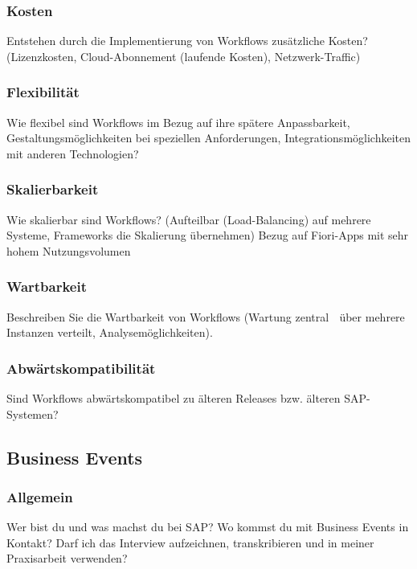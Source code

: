 \subsubsection{Kosten}

Entstehen durch die Implementierung von Workflows zusätzliche Kosten? (Lizenzkosten, Cloud-Abonnement (laufende Kosten), Netzwerk-Traffic)

\subsubsection{Flexibilität}

Wie flexibel sind Workflows im Bezug auf ihre spätere Anpassbarkeit, Gestaltungsmöglichkeiten bei speziellen Anforderungen, Integrationsmöglichkeiten mit anderen Technologien?

\subsubsection{Skalierbarkeit}

Wie skalierbar sind Workflows? (Aufteilbar (Load-Balancing) auf mehrere Systeme, Frameworks die Skalierung übernehmen) Bezug auf Fiori-Apps mit sehr hohem Nutzungsvolumen

\subsubsection{Wartbarkeit}

Beschreiben Sie die Wartbarkeit von Workflows (Wartung zentral  über mehrere Instanzen verteilt, Analysemöglichkeiten). 

\subsubsection{Abwärtskompatibilität}

Sind Workflows abwärtskompatibel zu älteren Releases bzw. älteren SAP-Systemen?

\subsection*{Business Events} \label{FB_Business-Events}

\subsubsection{Allgemein}

Wer bist du und was machst du bei SAP? \newline
Wo kommst du mit Business Events in Kontakt? \newline
Darf ich das Interview aufzeichnen, transkribieren und in meiner Praxisarbeit verwenden?

